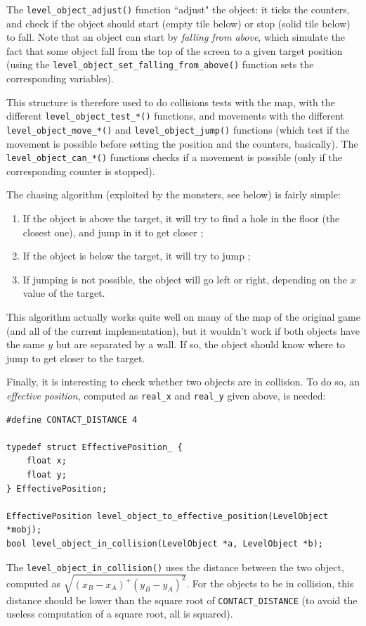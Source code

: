 \documentclass[12pt,a4paper]{article}
\newcommand{\cc}[1]{\texttt{#1}}
\begin{document}
The \cc{level_object_adjust()} function ``adjust" the object: it ticks the counters, and check if the object should start (empty tile below) or stop (solid tile below) to fall. Note that an object can start by \textit{falling from above}, which simulate the fact that some object fall from the top of the screen to a given target position (using the \cc{level_object_set_falling_from_above()} function sets the corresponding variables).

This structure is therefore used to do collisions tests with the map, with the different \cc{level_object_test_*()} functions, and movements with the different \cc{level_object_move_*()} and \cc{level_object_jump()} functions (which test if the movement is possible before setting the position and the counters, basically). The \cc{level_object_can_*()} functions checks if a movement is possible (only if the corresponding counter is stopped).

The chasing algorithm (exploited by the monsters, see below) is fairly simple:\begin{enumerate}
\item If the object is above the target, it will try to find a hole in the floor (the closest one), and jump in it to get closer ;
\item If the object is below the target, it will try to jump ;
\item If jumping is not possible, the object will go left or right, depending on the $x$ value of the target.
\end{enumerate}
This algorithm actually works quite well on many of the map of the original game (and all of the current implementation), but it wouldn't work if both objects have the same $y$ but are separated by a wall. If so, the object should know where to jump to get closer to the target.

Finally, it is interesting to check whether two objects are in collision. To do so, an \textit{effective position}, computed as \cc{real_x} and \cc{real_y} given above, is needed:
\begin{verbatim}
#define CONTACT_DISTANCE 4

typedef struct EffectivePosition_ {
	float x;
	float y;
} EffectivePosition;

EffectivePosition level_object_to_effective_position(LevelObject *mobj);
bool level_object_in_collision(LevelObject *a, LevelObject *b);
\end{verbatim}

The \cc{level_object_in_collision()} uses the distance between the two object, computed as $\sqrt{(x_B-x_A)^+(y_B-y_A)^2}$. For the objects to be in collision, this distance should be lower than the square root of \cc{CONTACT_DISTANCE} (to avoid the useless computation of a square root, all is squared).
\end{document}
